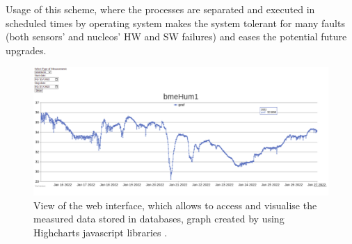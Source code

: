 \par

Usage of this scheme, where the processes are separated and executed in scheduled times by operating system makes the system tolerant for many faults (both sensors' and nucleos' HW and SW failures) and eases the potential future upgrades.



\begin{figure}[H]
 \centering
 \includegraphics[scale=0.25, angle = 0]{./pictures/RemoteWeb.png}
 \caption{View of the web interface, which allows to access and visualise the measured data stored in databases, graph created by using Highcharts javascript libraries \cite{Canvas}.}
 \label{PMT orientation}
 
\end{figure}

